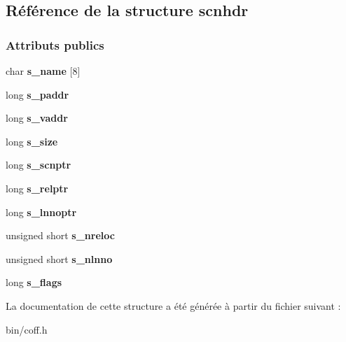 \hypertarget{structscnhdr}{}\subsection{Référence de la structure scnhdr}
\label{structscnhdr}
\subsubsection*{Attributs publics}
\begin{DoxyCompactItemize}
\item 
\hypertarget{structscnhdr_abe40ce76b9ded81d66e7244b788342c3}{}\label{structscnhdr_abe40ce76b9ded81d66e7244b788342c3} 
char {\bfseries s\+\_\+name} \mbox{[}8\mbox{]}
\item 
\hypertarget{structscnhdr_ab531808aec071562a3c38b88210084c0}{}\label{structscnhdr_ab531808aec071562a3c38b88210084c0} 
long {\bfseries s\+\_\+paddr}
\item 
\hypertarget{structscnhdr_add2dee0b914b0e29b168679ee8d27a65}{}\label{structscnhdr_add2dee0b914b0e29b168679ee8d27a65} 
long {\bfseries s\+\_\+vaddr}
\item 
\hypertarget{structscnhdr_a7cdbb607531d22601dfeb13c712a62e7}{}\label{structscnhdr_a7cdbb607531d22601dfeb13c712a62e7} 
long {\bfseries s\+\_\+size}
\item 
\hypertarget{structscnhdr_a5603e73e6ac6ada2213af60db249f354}{}\label{structscnhdr_a5603e73e6ac6ada2213af60db249f354} 
long {\bfseries s\+\_\+scnptr}
\item 
\hypertarget{structscnhdr_a5fee8394b5d701d2dd438148eac01198}{}\label{structscnhdr_a5fee8394b5d701d2dd438148eac01198} 
long {\bfseries s\+\_\+relptr}
\item 
\hypertarget{structscnhdr_a9801f152881766cad49697e86bcdab41}{}\label{structscnhdr_a9801f152881766cad49697e86bcdab41} 
long {\bfseries s\+\_\+lnnoptr}
\item 
\hypertarget{structscnhdr_aedc8735ed9399e1a051a143a91f712ac}{}\label{structscnhdr_aedc8735ed9399e1a051a143a91f712ac} 
unsigned short {\bfseries s\+\_\+nreloc}
\item 
\hypertarget{structscnhdr_a155b098ec47dcf0b865a3c10d3bf8891}{}\label{structscnhdr_a155b098ec47dcf0b865a3c10d3bf8891} 
unsigned short {\bfseries s\+\_\+nlnno}
\item 
\hypertarget{structscnhdr_a05f6e51576715b386f566f81b52483c0}{}\label{structscnhdr_a05f6e51576715b386f566f81b52483c0} 
long {\bfseries s\+\_\+flags}
\end{DoxyCompactItemize}


La documentation de cette structure a été générée à partir du fichier suivant \+:\begin{DoxyCompactItemize}
\item 
bin/coff.\+h\end{DoxyCompactItemize}

